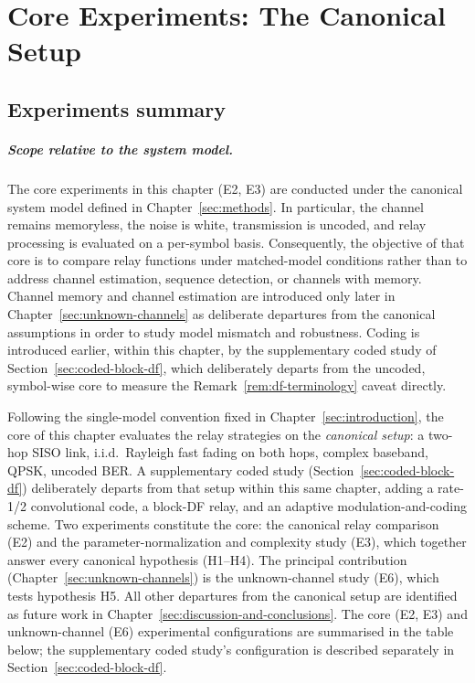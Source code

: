 \chapter{Core Experiments: The Canonical Setup}\label{sec:experiments}

\section{Experiments summary}\label{sec:experiments-summary}

\paragraph{Scope relative to the system model.}
The core experiments in this chapter (E2, E3) are conducted under the canonical
system model defined in Chapter~\ref{sec:methods}. In particular,
the channel remains memoryless, the noise is white, transmission is
uncoded, and relay processing is evaluated on a per-symbol basis.
Consequently, the objective of that core is to compare relay
functions under matched-model conditions rather than to address
channel estimation, sequence detection, or channels with memory.
Channel memory and channel estimation are introduced only later in
Chapter~\ref{sec:unknown-channels} as deliberate departures from the
canonical assumptions in order to study model mismatch and robustness.
Coding is introduced earlier, within this chapter, by the supplementary
coded study of Section~\ref{sec:coded-block-df}, which deliberately
departs from the uncoded, symbol-wise core to measure the
Remark~\ref{rem:df-terminology} caveat directly.

Following the single-model convention fixed in Chapter~\ref{sec:introduction}, the core of this chapter evaluates the relay strategies on the \emph{canonical setup}: a two-hop SISO link, i.i.d.\ Rayleigh fast fading on both hops, complex baseband, QPSK, uncoded BER. A supplementary coded study (Section~\ref{sec:coded-block-df}) deliberately departs from that setup within this same chapter, adding a rate-1/2 convolutional code, a block-DF relay, and an adaptive modulation-and-coding scheme. Two experiments constitute the core: the canonical relay comparison (E2) and the parameter-normalization and complexity study (E3), which together answer every canonical hypothesis (H1--H4). The principal contribution (Chapter~\ref{sec:unknown-channels}) is the unknown-channel study (E6), which tests hypothesis H5. All other departures from the canonical setup are identified as future work in Chapter~\ref{sec:discussion-and-conclusions}.
The core (E2, E3) and unknown-channel (E6) experimental configurations are summarised in the table below; the supplementary coded study's configuration is described separately in Section~\ref{sec:coded-block-df}.

